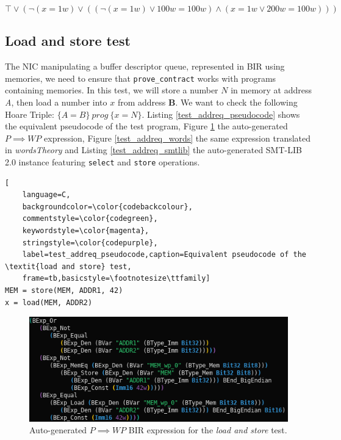 \documentclass{kththesis}
\newcommand{\htriple}[3]{\ensuremath{\{#1\}~#2~\{#3\}}}
\newcommand{\WP}{\ensuremath{\mathit{WP}}}
\begin{document}
\begin{equation}
    \top \lor
    (\neg(x = 1w) \lor ((\neg(x = 1w) \lor 100w = 100w) \land (x = 1w \lor 200w = 100w)))
    \label{test_cjmp_words}
\end{equation}

\subsection{Load and store test} \label{addreq_test}

The \gls{NIC} manipulating a buffer descriptor queue, represented in BIR using memories, we need to ensure that \texttt{prove\_contract} works with programs containing memories. In this test, we will store a number $N$ in memory at address \textit{A}, then load a number into $x$ from address \textbf{B}. We want to check the following Hoare Triple: \htriple{A=B}{prog}{x=N}. Listing \ref{test_addreq_pseudocode} shows the equivalent pseudocode of the test program, Figure \ref{test_addreq_bir} the auto-generated $P \implies \WP$ expression, Figure \ref{test_addreq_words} the same expression translated in \textit{wordsTheory} and Listing \ref{test_addreq_smtlib} the auto-generated SMT-LIB 2.0 instance featuring \texttt{select} and \texttt{store} operations.

\begin{lstlisting}[
    language=C,
    backgroundcolor=\color{codebackcolour},
    commentstyle=\color{codegreen},
    keywordstyle=\color{magenta},
    stringstyle=\color{codepurple},
    label=test_addreq_pseudocode,caption=Equivalent pseudocode of the \textit{load and store} test,
    frame=tb,basicstyle=\footnotesize\ttfamily]
MEM = store(MEM, ADDR1, 42)
x = load(MEM, ADDR2)
\end{lstlisting}

\begin{figure}[!h]
	\includegraphics[width=\textwidth]{figures/test_addreq_bir.png}
	\centering
	\caption{Auto-generated $P \implies \WP$ BIR expression for the \textit{load and store} test.}
	\label{test_addreq_bir}
\end{figure}
\end{document}
